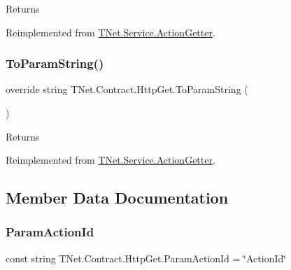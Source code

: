 \begin{DoxyReturn}{Returns}

\end{DoxyReturn}


Reimplemented from \mbox{\hyperlink{class_t_net_1_1_service_1_1_action_getter_af318ee8a4671b6000b036c4c57221458}{T\+Net.\+Service.\+Action\+Getter}}.

\mbox{\label{class_t_net_1_1_contract_1_1_http_get_ae56808541aaa8e27cabf0813ee0dc424}} 
\subsubsection{\texorpdfstring{To\+Param\+String()}{ToParamString()}}
{\footnotesize\ttfamily override string T\+Net.\+Contract.\+Http\+Get.\+To\+Param\+String (\begin{DoxyParamCaption}{ }\end{DoxyParamCaption})\hspace{0.3cm}{\ttfamily [virtual]}}





\begin{DoxyReturn}{Returns}

\end{DoxyReturn}


Reimplemented from \mbox{\hyperlink{class_t_net_1_1_service_1_1_action_getter_a705ee3441e620f15dcb5e52fcd9727ec}{T\+Net.\+Service.\+Action\+Getter}}.



\subsection{Member Data Documentation}
\mbox{\label{class_t_net_1_1_contract_1_1_http_get_a1565147483898b7080c64af08e737619}} 
\subsubsection{\texorpdfstring{Param\+Action\+Id}{ParamActionId}}
{\footnotesize\ttfamily const string T\+Net.\+Contract.\+Http\+Get.\+Param\+Action\+Id = \char`\"{}Action\+Id\char`\"{}}





